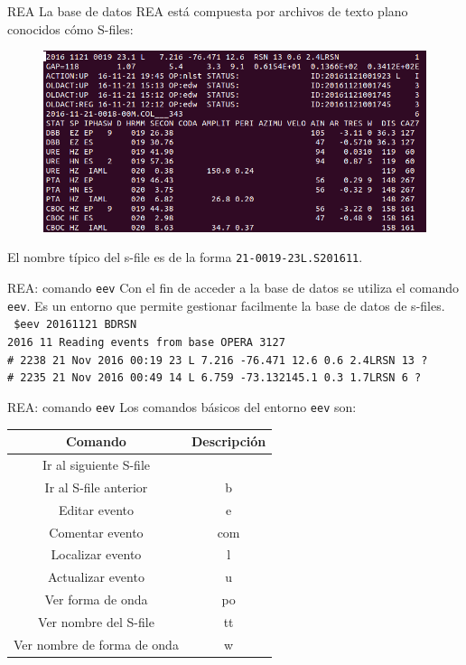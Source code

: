 \documentclass[11pt]{beamer}
\begin{document}
\begin{frame}{REA}
La base de datos REA está compuesta por archivos de texto plano conocidos cómo S-files:\\
\begin{center}
\begin{figure}
\includegraphics[scale=0.3]{sfile.png}
\end{figure}
\end{center}
El nombre típico del s-file es de la forma {\tt 21-0019-23L.S201611}.
\end{frame}

\begin{frame}[fragile]{REA: comando {\tt eev}}
Con el fin de acceder a la base de datos se utiliza el comando {\tt eev}. Es un entorno que permite gestionar facilmente la base de datos de s-files.\\
{\scriptsize \tt
\$eev 20161121 BDRSN\\
2016 11 Reading events from base OPERA  3127\\ 
\# 2238 21 Nov 2016 00:19 23  L   7.216 -76.471 12.6    0.6 2.4LRSN   13  ?\\
\# 2235 21 Nov 2016 00:49 14  L   6.759 -73.132145.1    0.3 1.7LRSN    6  ?\\
}
\end{frame}

\begin{frame}{REA: comando {\tt eev}}
Los comandos básicos del entorno {\tt eev} son: 
\begin{table}
\begin{tabular}{|c|c|}
\hline 
{\bf Comando}  & {\bf Descripción} \\ 
\hline 
Ir al siguiente S-file & \keys{\return} \\ 
\hline 
Ir al S-file anterior & b \keys{\return} \\ 
\hline 
Editar evento & e \keys{\return} \\ 
\hline 
Comentar evento & com \keys{\return} \\ 
\hline
Localizar evento & l \keys{\return} \\ 
\hline
Actualizar evento & u \keys{\return} \\ 
\hline
Ver forma de onda & po \keys{\return} \\ 
\hline
Ver nombre del S-file & tt \keys{\return} \\ 
\hline
Ver nombre de forma de onda & w \keys{\return} \\ 
\hline
\end{tabular} 
\end{table}
\end{frame}
\end{document}
